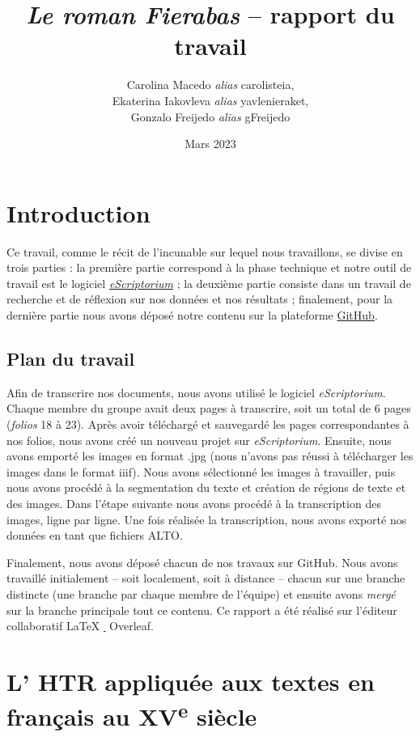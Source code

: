 \documentclass{article}
\title{\emph{Le roman Fierabas} -- rapport du travail}
\author{Carolina Macedo \emph{alias} carolisteia, \\ 
Ekaterina Iakovleva \emph{alias} yavlenieraket, \\
Gonzalo Freijedo \emph{alias} gFreijedo}
\date{Mars 2023}
\begin{document}
\maketitle

\section{Introduction}

Ce travail, comme le récit de l’incunable sur lequel nous travaillons, se divise en trois parties : la première partie correspond à la phase technique et notre outil de travail est le logiciel \href{https://traces6.paris.inria.fr/}{\textit{eScriptorium}} ; la deuxième partie consiste dans un travail de recherche et de réflexion sur nos données et nos résultats ; finalement, pour la dernière partie nous avons déposé notre contenu sur la plateforme \href{https://github.com/yavlenieraket/HN-2022--Fierabras_incunable-} {GitHub}.

\subsection{Plan du travail}

Afin de transcrire nos documents, nous avons utilisé le logiciel \emph{eScriptorium}. Chaque membre du groupe avait deux pages à transcrire, soit un total de 6 pages (\emph{folios} 18 à 23). Après avoir téléchargé et sauvegardé les pages correspondantes à nos folios, nous avons créé un nouveau projet sur \emph{eScriptorium}. Ensuite, nous avons emporté les images en format .jpg (nous n’avons pas réussi à télécharger les images dans le format iiif). Nous avons sélectionné les images à travailler, puis nous avons procédé à la segmentation du texte et création de régions de texte et des images. Dans l'étape suivante nous avons procédé à la transcription des images, ligne par ligne. Une fois réalisée la transcription, nous avons exporté nos données en tant que fichiers ALTO.

Finalement, nous avons déposé chacun de nos travaux sur GitHub. Nous avons travaillé initialement -- soit localement, soit  à distance -- chacun sur une branche distincte (une branche par chaque membre de l'équipe) et ensuite avons \emph{mergé} sur la branche principale tout ce contenu. Ce rapport a été réalisé sur l'éditeur collaboratif \LaTeX   
 \href{https://www.overleaf.com/} \, {Overleaf}. 


\section{L’ HTR appliquée aux textes en français au XV\textsuperscript{e} siècle}
\end{document}
